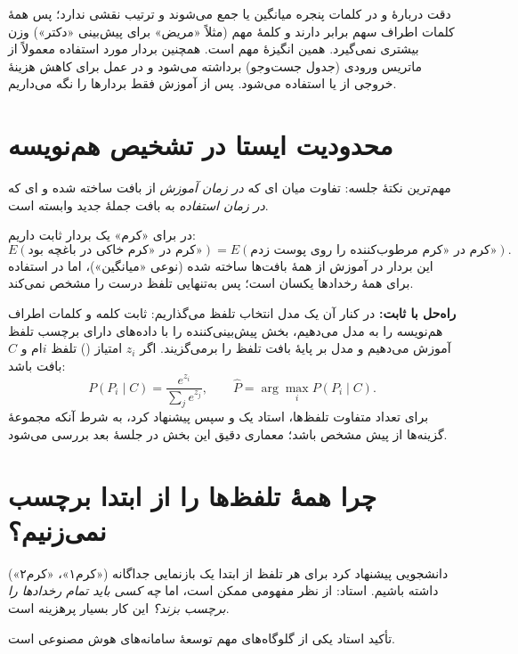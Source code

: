 \begin{correctionbox}{دقت دربارهٔ  و }
در  کلمات پنجره میانگین یا جمع می‌شوند و ترتیب نقشی ندارد؛ پس همهٔ کلمات اطراف سهم برابر دارند و کلمهٔ مهم (مثلاً «مریض» برای پیش‌بینی «دکتر») وزن بیشتری نمی‌گیرد. همین انگیزهٔ مهم  است. همچنین بردار مورد استفاده معمولاً از ماتریس ورودی (جدول جست‌وجو) برداشته می‌شود و در عمل برای کاهش هزینهٔ خروجی از  یا  استفاده می‌شود. پس از آموزش فقط بردارها را نگه می‌داریم.
\end{correctionbox}

\section{محدودیت  ایستا در تشخیص هم‌نویسه}

مهم‌ترین نکتهٔ جلسه: تفاوت میان ای که \emph{در زمان آموزش} از بافت ساخته شده و ای که \emph{در زمان استفاده} به بافت جملهٔ جدید وابسته است.

در  برای «کرم» یک بردار ثابت داریم:
\[
E(\text{کرم در «کرم خاکی در باغچه بود»})=E(\text{کرم در «کرم مرطوب‌کننده را روی پوست زدم»}).
\]
این بردار در آموزش از همهٔ بافت‌ها ساخته شده (نوعی «میانگین»)، اما در استفاده برای همهٔ رخدادها یکسان است؛ پس به‌تنهایی تلفظ درست را مشخص نمی‌کند.

\textbf{راه‌حل با  ثابت:} در کنار آن یک مدل انتخاب تلفظ می‌گذاریم:  ثابت کلمه و کلمات اطراف هم‌نویسه را به مدل می‌دهیم، بخش پیش‌بینی‌کننده را با داده‌های دارای برچسب تلفظ آموزش می‌دهیم و مدل بر پایهٔ بافت تلفظ را برمی‌گزیند. اگر $z_i$ امتیاز () تلفظ $i$ام و $C$ بافت باشد:
\[
P(P_i\mid C)=\frac{e^{z_i}}{\sum_j e^{z_j}},\qquad
\hat P=\arg\max_i P(P_i\mid C).
\]
برای تعداد متفاوت تلفظ‌ها، استاد یک  و سپس  پیشنهاد کرد، به شرط آنکه مجموعهٔ گزینه‌ها از پیش مشخص باشد؛ معماری دقیق این بخش در جلسهٔ بعد بررسی می‌شود.

\section{چرا همهٔ تلفظ‌ها را از ابتدا برچسب نمی‌زنیم؟}
\label{sec:selfsup}

دانشجویی پیشنهاد کرد برای هر تلفظ از ابتدا یک بازنمایی جداگانه («کرم۱»، «کرم۲») داشته باشیم. استاد: از نظر مفهومی ممکن است، اما \emph{چه کسی باید تمام رخدادها را برچسب بزند؟} این کار بسیار پرهزینه است.

\begin{exambox}{تأکید استاد}
 یکی از گلوگاه‌های مهم توسعهٔ سامانه‌های هوش مصنوعی است.
\end{exambox}


